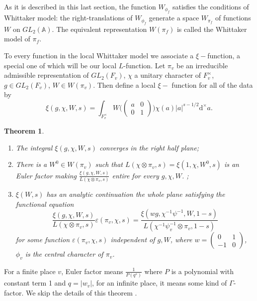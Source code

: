 \documentclass[12pt,a4paper,english]{article}
\theoremstyle{plain}
\newtheorem{thm}{Theorem}[section]
\theoremstyle{definition}
\begin{document}
As it is described in this last section, the function $W_{\phi_{f}}$ satisfies the conditions of Whittaker model: the right-translations of $W_{\phi_{f}}$ generate a space $W_{\pi_{f}}$ of functions $W$ on $GL_{2}(\mathbb{\mathbb{A}})$. The equivalent representation $W(\pi_{f})$ is called the Whittaker model of $\pi_{f}$.

To every function in the local Whittaker model we associate a $\xi-$function, a special one of which will be our local $L$-function. Let $\pi_{v}$ be an irreducible admissible representation of $GL_{2}(F_{v})$, $\chi$ a unitary character of $F^{\times}_{v}$, $g\in GL_{2}(F_{v})$, $W\in W(\pi_{v})$. Then define a local $\xi-$ function for all of the data by
\begin{equation*}
    \xi(g,\chi,W,s)=\int_{F^{\times}_{v}}W\bigg(\begin{pmatrix}
    a&0\\
    0&1
    \end{pmatrix}\bigg)\chi(a)|a|^{s-1/2}\text{d}^{\times}a.
\end{equation*}
\begin{thm}
\begin{enumerate}
    \item The integral $\xi(g,\chi,W,s)$ converges in the right half plane;
    \item There is a $W^{0}\in W(\pi_{v})$ such that $L(\chi\otimes \pi_{v},s)=\xi(1,\chi,W^{0},s)$ is an Euler factor making $\frac{\xi(g,\chi,W,s)}{L(\chi\otimes\pi_{v},s)}$ entire for every $g, \chi, W$. ;
    \item $\xi(W,s)$ has an analytic continuation the whole plane satisfying the functional equation
    \begin{equation*}
        \frac{\xi(g,\chi,W,s)}{L(\chi\otimes\pi_{v},s)}\varepsilon(\pi_{v},\chi,s)=\frac{\xi(wg,\chi^{-1}\psi^{-1},W,1-s)}{L(\chi^{-1}\psi_{v}^{-1}\otimes\pi_{v},1-s)}
    \end{equation*}
    for some function $\varepsilon(\pi_{v},\chi,s)$ independent of $g, W$, where $w=\begin{pmatrix}
    0&1\\
    -1&0
    \end{pmatrix}$, $\phi_{v}$ is the central character of $\pi_{v}$.
\end{enumerate}
\end{thm}
For a finite place $v$, Euler factor means $\frac{1}{P(q^{s})}$ where $P$ is a polynomial with constant term 1 and $q=|w_{v}|$, for an infinite place, it means some kind of $\Gamma$-factor. We skip the details of this theorem \cite{gelbart2016automorphic}. 
\end{document}
